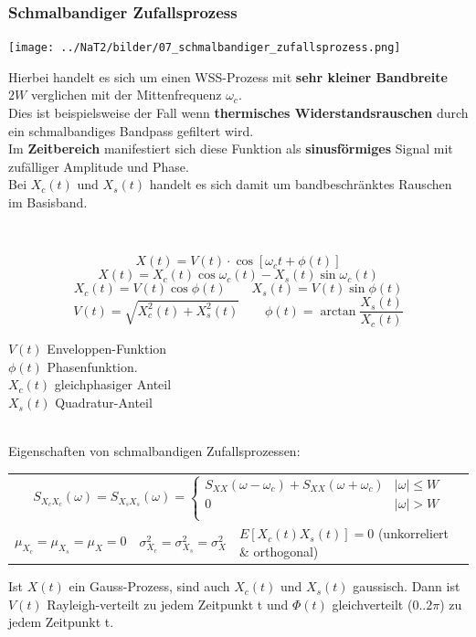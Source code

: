 \subsubsection{Schmalbandiger Zufallsprozess}
\label{schmalbandiger_zufallsprozess}
	\begin{minipage}{9.5cm}
		\texttt{[image: ../NaT2/bilder/07\_schmalbandiger\_zufallsprozess.png]}
  	\end{minipage}
	\begin{minipage}{8.8cm}
		Hierbei handelt es sich um einen WSS-Prozess mit \textbf{sehr kleiner Bandbreite} $2W$ verglichen mit der
		Mittenfrequenz $\omega_c$. \\
		Dies ist beispielsweise der Fall wenn \textbf{thermisches Widerstandsrauschen} durch ein schmalbandiges
		Bandpass gefiltert wird. \\
		Im \textbf{Zeitbereich} manifestiert sich diese Funktion als \textbf{sinusförmiges} Signal mit
		zufälliger Amplitude und Phase. \\
		Bei $X_{c}(t)$ und $X_{s}(t)$ handelt es sich damit um bandbeschr\"anktes Rauschen im Basisband.
  	\end{minipage} \\
	\begin{minipage}{10cm}
		\boldmath$$X(t) = V(t) \cdot \cos \left[ \omega_{c}t + \phi(t) \right]$$ \unboldmath
		$$X(t) = X_{c}(t)\cos\omega_{c}(t) - X_{s}(t)\sin\omega_{c}(t)$$
		$$X_{c}(t) = V(t)\cos\phi(t) \qquad X_{s}(t) = V(t)\sin\phi(t)$$
		$$V(t) = \sqrt{X^{2}_{c}(t) + X^{2}_{s}(t)} \qquad \phi(t) = \arctan \frac{X_{s}(t)}{X_{c}(t)}$$
  	\end{minipage}
	\begin{minipage}{8cm}
		$V(t)$ Enveloppen-Funktion \\ 
        $\phi(t)$ Phasenfunktion. \\
		$X_{c}(t)$ gleichphasiger Anteil \\ 
        $X_{s}(t)$ Quadratur-Anteil        
  	\end{minipage} \\

Eigenschaften von schmalbandigen Zufallsprozessen: \\

\renewcommand{\arraystretch}{1.5}
\begin{tabular}{p{4.5cm} p{4.5cm} p{9cm}}
	\multicolumn{3}{c}{$S_{X_{c}X_{c}}(\omega) = 		S_{X_{s}X_{s}}(\omega)
    = \left\lbrace \begin{array}{ll}
      S_{XX}(\omega -\omega_{c}) +S_{XX}(\omega +\omega_{c})
          & \mid\!\omega\!\mid \leq W \\
          0  & \mid\!\omega\!\mid > W \\
                       \end{array} \right. $} \\ 
	$\mu_{X_{c}} = \mu_{X_{s}} = \mu_{X} = 0$
		& $\sigma^{2}_{X_{c}} = \sigma^{2}_{X_{s}} = \sigma^{2}_{X}$
		& $E\left[ X_{c}(t)X_{s}(t) \right]  = 0$ (unkorreliert \& orthogonal) \\
\end{tabular}
\renewcommand{\arraystretch}{1}

Ist $X(t)$ ein Gauss-Prozess, sind auch $X_{c}(t)$ und $X_{s}(t)$ gaussisch. Dann ist $V(t)$
Rayleigh-verteilt zu jedem Zeitpunkt t und $\Phi(t)$ gleichverteilt ($0..2\pi$) zu jedem
Zeitpunkt t. 

